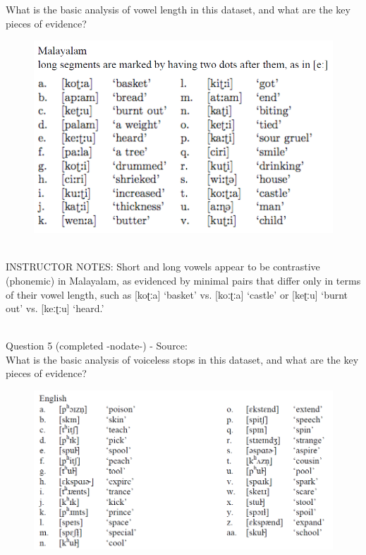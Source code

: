 \documentclass[12pt]{article}
\begin{document}
What is the basic analysis of vowel length in this dataset, and what are the key pieces of evidence?\\

\begin{figure}[H]
\includegraphics{../images/malayalam.png}
\end{figure}

~\\
INSTRUCTOR NOTES: Short and long vowels appear to be contrastive (phonemic) in Malayalam, as evidenced by minimal pairs that differ only in terms of their vowel length, such as [koʈːa] ‘basket’ vs. [koːʈːa] ‘castle’ or [keʈːu] ‘burnt out’ vs. [keːʈːu] ‘heard.’


~\\

{\large Question 5} (completed -nodate-) - Source: \\

What is the basic analysis of voiceless stops in this dataset, and what are the key pieces of evidence?\\

\begin{figure}[H]
\includegraphics{../images/english11.png}
\end{figure}
\end{document}
